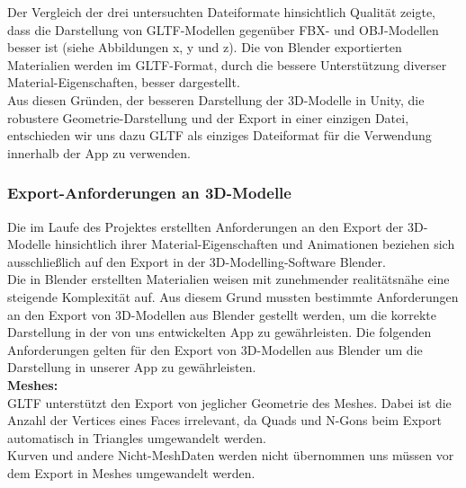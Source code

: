 \documentclass[titlepage, a4paper, 11pt]{scrartcl}
\begin{document}
    Der Vergleich der drei untersuchten Dateiformate hinsichtlich Qualität zeigte, dass die Darstellung von GLTF-Modellen gegenüber FBX- und OBJ-Modellen besser ist (siehe Abbildungen x, y und z). Die von Blender exportierten Materialien werden im GLTF-Format, durch die bessere Unterstützung diverser Material-Eigenschaften, besser dargestellt.\\

    Aus diesen Gründen, der besseren Darstellung der 3D-Modelle in Unity, die robustere Geometrie-Darstellung und der Export in einer einzigen Datei, entschieden wir uns dazu GLTF als einziges Dateiformat für die Verwendung innerhalb der App zu verwenden.
    \subsubsection{Export-Anforderungen an 3D-Modelle}
    Die im Laufe des Projektes erstellten Anforderungen an den Export der 3D-Modelle hinsichtlich ihrer Material-Eigenschaften und Animationen beziehen sich ausschließlich auf den Export in der 3D-Modelling-Software Blender.\\

    Die in Blender erstellten Materialien weisen mit zunehmender realitätsnähe eine steigende Komplexität auf. Aus diesem Grund mussten bestimmte Anforderungen an den Export von 3D-Modellen aus Blender gestellt werden, um die korrekte Darstellung in der von uns entwickelten App zu gewährleisten. Die folgenden Anforderungen gelten für den Export von 3D-Modellen aus Blender um die Darstellung in unserer App zu gewährleisten.\\

    \textbf{Meshes:}\\
    GLTF unterstützt den Export von jeglicher Geometrie des Meshes. Dabei ist die Anzahl der Vertices eines Faces irrelevant, da Quads und N-Gons beim Export automatisch in Triangles umgewandelt werden.\\
    Kurven und andere \glqq Nicht-Mesh\grqq Daten werden nicht übernommen uns müssen vor dem Export in Meshes umgewandelt werden.\\
\end{document}

